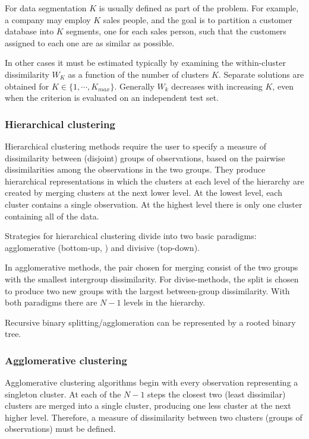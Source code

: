 For data segmentation $K$ is usually defined as part of the problem. For example, a company may employ $K$ sales people, and the goal is to partition a customer database into $K$ segments, one for each sales person, such that the customers assigned to each one are as similar as possible.

In other cases it must be estimated typically by examining the within-cluster dissimilarity $W_K$ as a function of the number of clusters $K$. Separate solutions are obtained for $K \in \{1, \cdots , K_{max}\}$. Generally $W_k$ decreases with increasing $K$, even when the criterion is evaluated on an independent test set.

\subsubsection{Hierarchical clustering}
Hierarchical clustering methods require the user to specify a measure of dissimilarity between (disjoint) groups of observations, based on the pairwise dissimilarities among the observations in the two groups. They produce hierarchical representations in which the clusters at each level of the hierarchy are created by merging clusters at the next lower level. At the lowest level, each cluster contains a single observation. At the highest level there is only one cluster containing all of the data.

Strategies for hierarchical clustering divide into two basic paradigms: agglomerative (bottom-up, ) and divisive (top-down).

In agglomerative methods, the pair chosen for merging consist of the two groups with the smallest intergroup dissimilarity. For divise-methods, the split is chosen to produce two new groups with the largest between-group dissimilarity. With both paradigms there are $N - 1$ levels in the hierarchy.

Recursive binary splitting/agglomeration can be represented by a rooted binary tree. 

\subsubsection{Agglomerative clustering}
Agglomerative clustering algorithms begin with every observation representing a singleton cluster. At each of the $N - 1$ steps the closest two (least dissimilar) clusters are merged into a single cluster, producing one less cluster at the next higher level. Therefore, a measure of dissimilarity between two clusters (groups of observations) must be defined.

